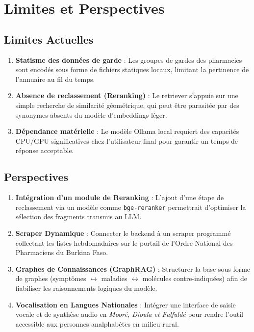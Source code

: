 \documentclass[12pt,a4paper]{article}
\begin{document}
\section{Limites et Perspectives}

\subsection{Limites Actuelles}
\begin{enumerate}
    \item \textbf{Statisme des données de garde} : Les groupes de gardes des pharmacies sont encodés sous forme de fichiers statiques locaux, limitant la pertinence de l'annuaire au fil du temps.
    \item \textbf{Absence de reclassement (Reranking)} : Le retriever s'appuie sur une simple recherche de similarité géométrique, qui peut être parasitée par des synonymes absents du modèle d'embeddings léger.
    \item \textbf{Dépendance matérielle} : Le modèle Ollama local requiert des capacités CPU/GPU significatives chez l'utilisateur final pour garantir un temps de réponse acceptable.
\end{enumerate}

\subsection{Perspectives}
\begin{enumerate}
    \item \textbf{Intégration d'un module de Reranking} : L'ajout d'une étape de reclassement via un modèle comme \texttt{bge-reranker} permettrait d'optimiser la sélection des fragments transmis au LLM.
    \item \textbf{Scraper Dynamique} : Connecter le backend à un scraper programmé collectant les listes hebdomadaires sur le portail de l'Ordre National des Pharmaciens du Burkina Faso.
    \item \textbf{Graphes de Connaissances (GraphRAG)} : Structurer la base sous forme de graphes (symptômes $\leftrightarrow$ maladies $\leftrightarrow$ molécules contre-indiquées) afin de fiabiliser les raisonnements logiques du modèle.
    \item \textbf{Vocalisation en Langues Nationales} : Intégrer une interface de saisie vocale et de synthèse audio en \textit{Mooré, Dioula et Fulfuldé} pour rendre l'outil accessible aux personnes analphabètes en milieu rural.
\end{enumerate}
\end{document}
